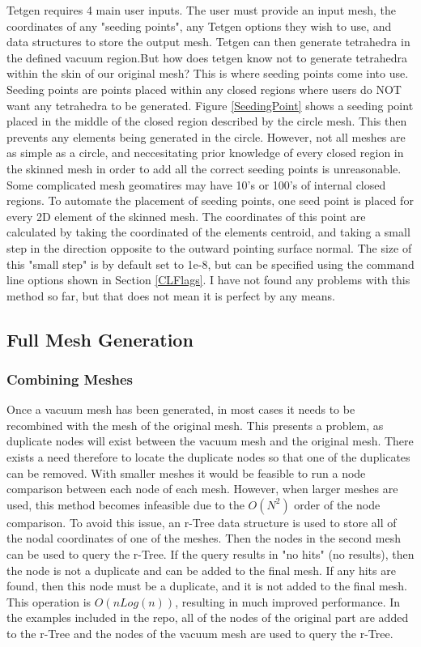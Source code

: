 \documentclass[12pt, letterpaper]{article}
\begin{document}
Tetgen requires 4 main user inputs. The user must provide an input mesh, the coordinates of any "seeding points", any Tetgen options they wish to use, and data structures to store the output mesh. Tetgen can then generate tetrahedra in the defined vacuum region.But how does tetgen know not to generate tetrahedra within the skin of our original mesh? This is where seeding points come into use. Seeding points are points placed within any closed regions where users do NOT want any tetrahedra to be generated. Figure \ref{SeedingPoint} shows a seeding point placed in the middle of the closed region described by the circle mesh. This then prevents any elements being generated in the circle. However, not all meshes are as simple as a circle, and neccesitating prior knowledge of every closed region in the skinned mesh in order to add all the correct seeding points is unreasonable. Some complicated mesh geomatires may have 10's or 100's of internal closed regions. To automate the placement of seeding points, one seed point is placed for every 2D element of the skinned mesh. The coordinates of this point are calculated by taking the coordinated of the elements centroid, and taking a small step in the direction opposite to the outward pointing surface normal. The size of this "small step" is by default set to 1e-8, but can be specified using the command line options shown in Section \ref{CLFlags}. I have not found any problems with this method so far, but that does not mean it is perfect by any means. 

\subsection{Full Mesh Generation}
\subsubsection{Combining Meshes} \label{rTree}
Once a vacuum mesh has been generated, in most cases it needs to be recombined with the mesh of the original mesh. This presents a problem, as duplicate nodes will exist between the vacuum mesh and the original mesh. There exists a need therefore to locate the duplicate nodes so that one of the duplicates can be removed. With smaller meshes it would be feasible to run a node comparison between each node of each mesh. However, when larger meshes are used, this method becomes infeasible due to the $O(N^2)$ order of the node comparison. To avoid this issue, an r-Tree data structure is used to store all of the nodal coordinates of one of the meshes. Then the nodes in the second mesh can be used to query the r-Tree. If the query results in "no hits" (no results), then the node is not a duplicate and can be added to the final mesh. If any hits are found, then this node must be a duplicate, and it is not added to the final mesh. This operation is $O(nLog(n))$, resulting in much improved performance. In the examples included in the repo, all of the nodes of the original part are added to the r-Tree and the nodes of the vacuum mesh are used to query the r-Tree.
\end{document}
